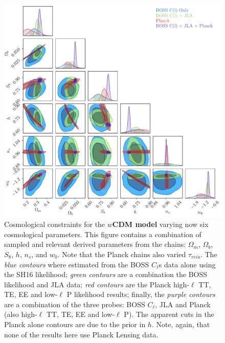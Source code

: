 \begin{figure}
\begin{center}
\includegraphics[width=\textwidth]{BOSS-FIGS/wCDM_Cosmology.pdf}
\caption[Cosmological constraints for the $w$CDM model.]{Cosmological constraints for the \textbf{$w$CDM model} varying now six cosmological parameters. This figure contains a combination of sampled and relevant derived parameters from the chains: $\Omega_m$, $\Omega_b$, $S_8$, $h$, $n_s$, and $w_0$. Note that the Planck chains also varied $\tau_{reio}$. The \textit{blue contours} where estimated from the BOSS $C_{\ell}$s data alone using the SH16 likelihood; \textit{green contours} are a combination the BOSS likelihood and JLA data; \textit{ red contours} are the Planck high-$\ell$ TT, TE, EE and low-$\ell$ P likelihood results; finally, the \textit{purple contours} are a combination of the three probes: BOSS $C_{\ell}$, JLA and Planck (also high-$\ell$ TT, TE, EE and low-$\ell$ P). The apparent cuts in the Planck alone contours are due to the prior in $h$. Note, again, that none of the results here use Planck Lensing data.}
\label{fig:wCDM_Cosmology}
\end{center}
\end{figure}


